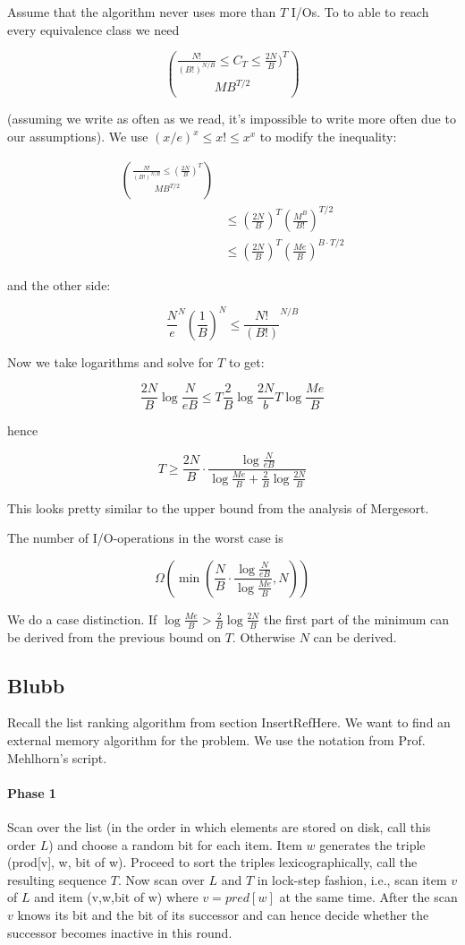 Assume that the algorithm never uses more than $T$ I/Os. To to able to reach every equivalence class we need

\[\frac{N!}{(B!)^{N/B}} \leq C_T \leq \frac{2N}{B})^T \choose{M}{B}^{T/2}\]

(assuming we write as often as we read, it's impossible to write more often due to our assumptions). We use $(x/e)^x\leq x! \leq x^x$ to modify the inequality:

\begin{align*}
\frac{N!}{(B!)^{N/B}} \leq (\frac{2N}{B})^T \choose{M}{B}^{T/2}\\
	&\leq (\frac{2N}{B})^T (\frac{M^B}{B!})^{T/2}\\
	&\leq (\frac{2N}{B})^T (\frac{Me}{B})^{B \cdot T/2}
\end{align*}

and the other side:

\[\frac{N}{e}^N (\frac{1}{B})^N \leq \frac{N!}{(B!)}^{N/B}\]

Now we take logarithms and solve for $T$ to get:

\[\frac{2N}{B} \log \frac{N}{eB} \leq T\frac{2}{B} \log \frac{2N}{b}  T \log \frac{Me}{B}\]

hence

\[T\geq \frac{2N}{B} \cdot \frac{\log \frac{N}{eB}}{\log \frac{Me}{B} + \frac{2}{B} \log \frac{2N}{B}}\]

This looks pretty similar to the upper bound from the analysis of Mergesort.

\begin{thm} The number of I/O-operations in the worst case is 

\[\Omega(\min \left(\frac{N}{B} \cdot \frac{\log \frac{N}{eB}}{\log \frac{Me}{B}}, N\right))\]
\end{thm}

\begin{pr} We do a case distinction. If $\log \frac{Me}{B} > \frac 2B \log \frac{2N}{B}$ the first part of the minimum can be derived from the previous bound on $T$. Otherwise $N$ can be derived.
\end{pr}

\subsection{Blubb}

Recall the list ranking algorithm from section InsertRefHere. We want to find an external memory algorithm for the problem. We use the notation from Prof. Mehlhorn's script.

\paragraph{Phase 1} Scan over the list (in the order in which elements are stored on disk, call this order $L$) and choose a random bit for each item. Item $w$ generates the triple (prod[v], w, bit of w). Proceed to sort the triples lexicographically, call the resulting sequence $T$. Now scan over $L$ and $T$ in lock-step fashion, i.e., scan item $v$ of $L$ and item (v,w,bit of w) where $v=pred[w]$ at the same time. After the scan $v$ knows its bit and the bit of its successor and can hence decide whether the successor becomes inactive in this round.